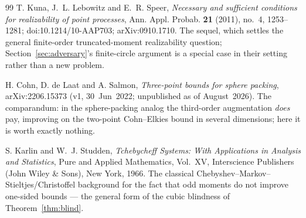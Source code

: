 \documentclass[11pt]{article}
\theoremstyle{plain}
\theoremstyle{definition}
\theoremstyle{remark}
\begin{document}
\begin{thebibliography}{99}
 T. Kuna, J.~L. Lebowitz and E.~R. Speer,
\emph{Necessary and sufficient conditions for realizability of point processes},
Ann. Appl. Probab. \textbf{21} (2011), no.~4, 1253--1281; doi:10.1214/10-AAP703;
arXiv:0910.1710. The sequel, which settles the general finite-order
truncated-moment
realizability question; Section~\ref{sec:adversary}'s finite-circle argument is a
special case in their setting rather than a new problem.

 H. Cohn, D. de Laat and A. Salmon, \emph{Three-point
bounds for sphere packing}, arXiv:2206.15373 (v1, 30~Jun~2022; unpublished as
of August~2026). The comparandum: in the
sphere-packing analog the third-order augmentation \emph{does} pay, improving
on the two-point Cohn--Elkies bound in several dimensions; here it is worth
exactly nothing.

 S. Karlin and W.~J. Studden, \emph{Tchebycheff Systems:
With Applications in Analysis and Statistics}, Pure and Applied Mathematics,
Vol.~XV, Interscience Publishers (John Wiley \& Sons), New York, 1966. The
classical Chebyshev--Markov--Stieltjes/Christoffel background for the fact that
odd moments do not improve one-sided bounds --- the general form of the cubic
blindness of Theorem~\ref{thm:blind}.

\end{thebibliography}
\end{document}
